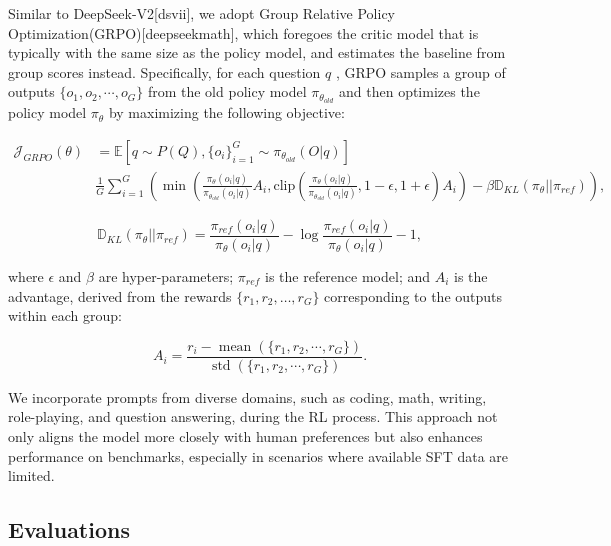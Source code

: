 \documentclass[11pt,a4paper]{article}
\begin{document}
Similar to DeepSeek-V2[dsvii], we adopt Group Relative Policy Optimization(GRPO)[deepseekmath], which foregoes the critic model that is typically with the same size as the policy model, and estimates the baseline from group scores instead. Specifically, for each question  $q$ , GRPO samples a group of outputs  $\{o_1, o_2, \cdots, o_G\}$  from the old policy model  $\pi_{\theta_{old}}$  and then optimizes the policy model  $\pi_{\theta}$  by maximizing the following objective:

$$\begin{equation}
\begin{split}
    \mathcal{J}_{GRPO}(\theta) &= \mathbb{E}{[q \sim P(Q), \{o_i\}_{i=1}^G \sim \pi_{\theta_{old}}(O|q)]}  \\
    & \frac{1}{G}\sum_{i=1}^G \left( \min \left( \frac{\pi_\theta(o_i |q)}{\pi_{\theta_{old}}(o_i |q)} A_i, \text{clip} \left( \frac{\pi_\theta(o_i |q)}{\pi_{\theta_{old}}(o_i |q)}, 1 - \epsilon, 1 + \epsilon \right)  A_i \right) - \beta \mathbb{D}_{KL}\left(\pi_{\theta} || \pi_{ref}\right)\right) ,
\end{split}

\end{equation}$$

$$\begin{equation}
    \mathbb{D}_{KL}\left(\pi_{\theta} || \pi_{ref}\right) = \frac{\pi_{ref}(o_i|q)}{\pi_{\theta}(o_i|q)}- \log\frac{\pi_{ref}(o_i|q)}{\pi_{\theta}(o_i|q)} - 1,
\end{equation}$$

where  $\epsilon$  and  $\beta$  are hyper-parameters;  $\pi_{ref}$  is the reference model; and  $A_i$  is the advantage, derived from the rewards  $\{r_1, r_2, \ldots, r_G\}$  corresponding to the outputs within each group:

$$\begin{equation}
    A_i = \frac{r_i - {\operatorname{mean}(\{r_1, r_2, \cdots, r_G\})}}{{\operatorname{std}(\{r_1, r_2, \cdots, r_G\})}}.
\end{equation}$$

We incorporate prompts from diverse domains, such as coding, math, writing, role-playing, and question answering, during the RL process. This approach not only aligns the model more closely with human preferences but also enhances performance on benchmarks, especially in scenarios where available SFT data are limited.

\subsection{Evaluations}
\end{document}
